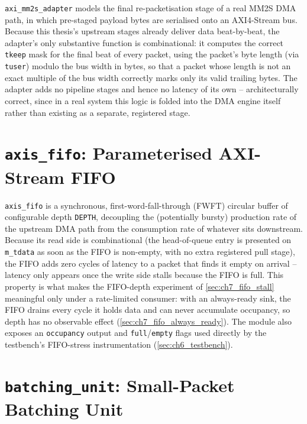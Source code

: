 \texttt{axi\_mm2s\_adapter} models the final re-packetisation stage of a real \ac{MM2S} DMA path, in which pre-staged payload bytes are serialised onto an AXI4-Stream bus. Because this thesis's upstream stages already deliver data beat-by-beat, the adapter's only substantive function is combinational: it computes the correct \texttt{tkeep} mask for the final beat of every packet, using the packet's byte length (via \texttt{tuser}) modulo the bus width in bytes, so that a packet whose length is not an exact multiple of the bus width correctly marks only its valid trailing bytes. The adapter adds no pipeline stages and hence no latency of its own -- architecturally correct, since in a real system this logic is folded into the DMA engine itself rather than existing as a separate, registered stage.

\section{\texttt{axis\_fifo}: Parameterised AXI-Stream FIFO}
\label{sec:ch4_fifo}

\texttt{axis\_fifo} is a synchronous, first-word-fall-through (\ac{FWFT}) circular buffer of configurable depth \texttt{DEPTH}, decoupling the (potentially bursty) production rate of the upstream DMA path from the consumption rate of whatever sits downstream. Because its read side is combinational (the head-of-queue entry is presented on \texttt{m\_tdata} as soon as the FIFO is non-empty, with no extra registered pull stage), the FIFO adds zero cycles of latency to a packet that finds it empty on arrival -- latency only appears once the write side stalls because the FIFO is full. This property is what makes the FIFO-depth experiment of \autoref{sec:ch7_fifo_stall} meaningful only under a rate-limited consumer: with an always-ready sink, the FIFO drains every cycle it holds data and can never accumulate occupancy, so depth has no observable effect (\autoref{sec:ch7_fifo_always_ready}). The module also exposes an \texttt{occupancy} output and \texttt{full}/\texttt{empty} flags used directly by the testbench's FIFO-stress instrumentation (\autoref{sec:ch6_testbench}).

\section{\texttt{batching\_unit}: Small-Packet Batching Unit}
\label{sec:ch4_batching_unit}

